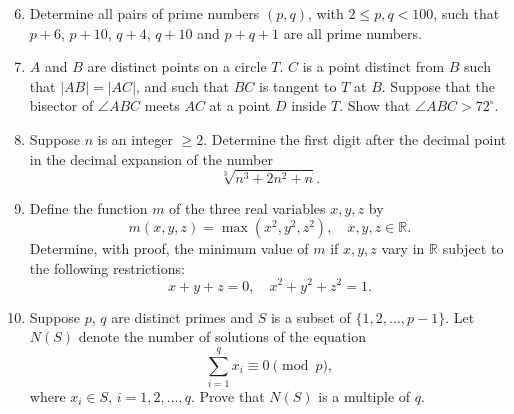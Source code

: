 \documentclass[12pt]{article}
\begin{document}
\begin{enumerate}
\setcounter{enumi}{5}
\item Determine all pairs of prime numbers $(p, q)$, with $2 \leq p, q < 100$, such that $p + 6$, $p + 10$, $q + 4$, $q + 10$ and $p + q + 1$ are all prime numbers.

\item $A$ and $B$ are distinct points on a circle $T$. $C$ is a point distinct from $B$ such that $|AB| = |AC|$, and such that $BC$ is tangent to $T$ at $B$. Suppose that the bisector of $\angle ABC$ meets $AC$ at a point $D$ inside $T$. Show that $\angle ABC > 72^\circ$.

\item Suppose $n$ is an integer $\geq 2$. Determine the first digit after the decimal point in the decimal expansion of the number
\[
\sqrt[3]{n^3 + 2n^2 + n}.
\]

\item Define the function $m$ of the three real variables $x, y, z$ by
\[
m(x, y, z) = \max(x^2, y^2, z^2), \quad x, y, z \in \mathbb{R}.
\]
Determine, with proof, the minimum value of $m$ if $x, y, z$ vary in $\mathbb{R}$ subject to the following restrictions:
\[
x + y + z = 0, \quad x^2 + y^2 + z^2 = 1.
\]

\item Suppose $p$, $q$ are distinct primes and $S$ is a subset of $\{1, 2, \ldots, p-1\}$. Let $N(S)$ denote the number of solutions of the equation
\[
\sum_{i=1}^{q} x_i \equiv 0 \pmod{p},
\]
where $x_i \in S$, $i = 1, 2, \ldots, q$. Prove that $N(S)$ is a multiple of $q$.

\end{enumerate}
\end{document}
